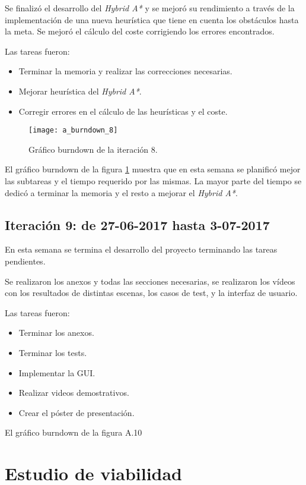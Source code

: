 Se finalizó el desarrollo del \textit{Hybrid A*} y se mejoró su rendimiento a través de la implementación de una nueva heurística que tiene en cuenta los obstáculos hasta la meta. Se mejoró el cálculo del coste corrigiendo los errores encontrados.

Las tareas fueron:
\begin{itemize}
\item Terminar la memoria y realizar las correcciones necesarias.
\item Mejorar heurística del \textit{Hybrid A*}.
\item Corregir errores en el cálculo de las heurísticas y el coste.
\end{itemize}

\begin{figure}[htpb]
    \centering
    \texttt{[image: a\_burndown\_8]}
    \caption[Gráfico burndown de la iteración 8]{Gráfico burndown de la iteración 8.}
    \label{fig:burndown8}
\end{figure}

El gráfico burndown de la figura \ref{fig:burndown8} muestra que en esta semana se planificó mejor las subtareas y el tiempo requerido por las mismas. La mayor parte del tiempo se dedicó a terminar la memoria y el resto a mejorar el \textit{Hybrid A*}.

\newpage
\subsection{Iteración 9: de 27-06-2017 hasta 3-07-2017}
En esta semana se termina el desarrollo del proyecto terminando las tareas pendientes.

Se realizaron los anexos y todas las secciones necesarias, se realizaron los vídeos con los resultados de distintas escenas, los casos de test, y la interfaz de usuario.

Las tareas fueron:
\begin{itemize}
\item Terminar los anexos.
\item Terminar los tests.
\item Implementar la GUI.
\item Realizar videos demostrativos.
\item Crear el póster de presentación.
\end{itemize}

El gráfico burndown de la figura A.10


\section{Estudio de viabilidad}

